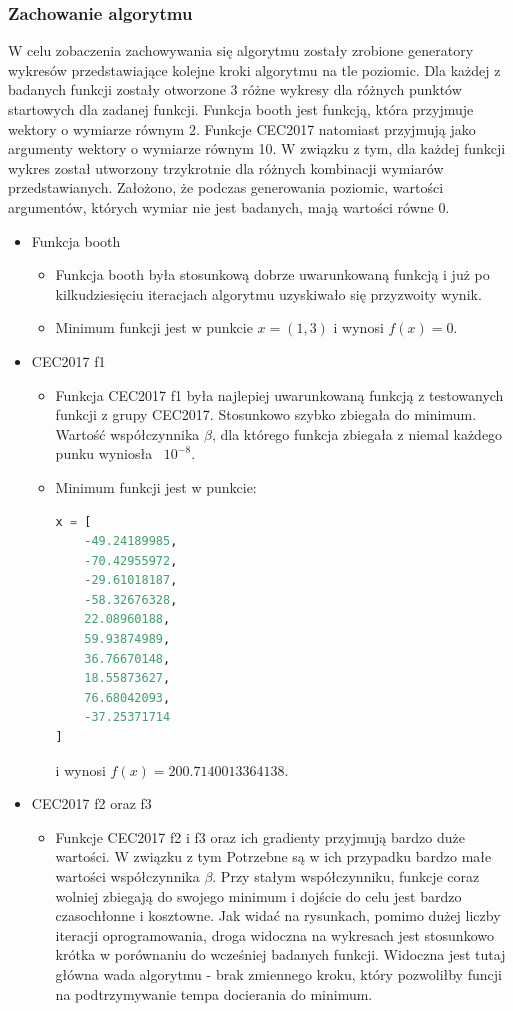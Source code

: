 	\subsubsection{Zachowanie algorytmu}
	W celu zobaczenia zachowywania się algorytmu zostały zrobione generatory wykresów przedstawiające kolejne kroki algorytmu na tle poziomic. Dla każdej z badanych funkcji zostały otworzone 3 różne wykresy dla różnych punktów startowych dla zadanej funkcji. Funkcja booth jest funkcją, która przyjmuje wektory o wymiarze równym 2. Funkcje CEC2017 natomiast przyjmują jako argumenty wektory o wymiarze równym 10. W związku z tym, dla każdej funkcji wykres został utworzony trzykrotnie dla różnych kombinacji wymiarów przedstawianych. Założono, że podczas generowania poziomic, wartości argumentów, których wymiar nie jest badanych, mają wartości równe 0. 
	\begin{itemize}
		\item Funkcja booth
		 \begin{itemize}
		 	\item Funkcja booth była stosunkową dobrze uwarunkowaną funkcją i już po kilkudziesięciu iteracjach algorytmu uzyskiwało się przyzwoity wynik.
		 	\item Minimum funkcji jest w punkcie $x = (1, 3)$ i wynosi $f(x) = 0$.
		 \end{itemize}
		\item CEC2017 f1
		\begin{itemize}
			\item Funkcja CEC2017 f1 była najlepiej uwarunkowaną funkcją z testowanych funkcji z grupy CEC2017. Stosunkowo szybko zbiegała do minimum. Wartość współczynnika $\beta$, dla którego funkcja zbiegała z niemal każdego punku wyniosła ~$10^{-8}$.
			\item Minimum funkcji jest w punkcie:
			    \begin{lstlisting}[language=Python]
x = [
	-49.24189985,
	-70.42955972,
	-29.61018187,
	-58.32676328,
	22.08960188,
	59.93874989,
	36.76670148,
	18.55873627,
	76.68042093,
	-37.25371714
]
				\end{lstlisting}
			i wynosi $f(x) = 200.7140013364138$.
		\end{itemize}
	\item CEC2017 f2 oraz f3
	\begin{itemize}
		\item Funkcje CEC2017 f2 i f3 oraz ich gradienty przyjmują bardzo duże wartości. W związku z tym Potrzebne są w ich przypadku bardzo małe wartości współczynnika $\beta$. Przy stałym współczynniku, funkcje coraz wolniej zbiegają do swojego minimum i dojście do celu jest bardzo czasochłonne i kosztowne. Jak widać na rysunkach, pomimo dużej liczby iteracji oprogramowania, droga widoczna na wykresach jest stosunkowo krótka w porównaniu do wcześniej badanych funkcji. Widoczna jest tutaj główna wada algorytmu - brak zmiennego kroku, który pozwoliłby funcji na podtrzymywanie tempa docierania do minimum.

\end{itemize}
\end{itemize}
